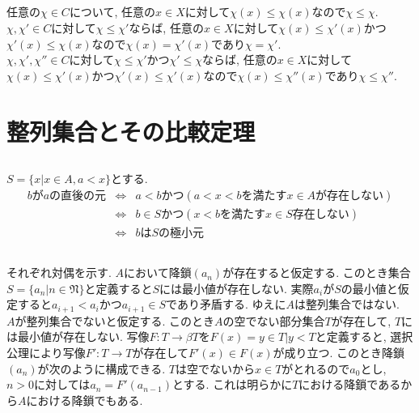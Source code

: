 \documentclass{jsarticle}
\begin{document}
\subsection{} %
任意の$\chi \in C$について, 任意の$x \in X$に対して$\chi(x) \le \chi(x)$なので$\chi \le \chi$.\\
$\chi, \chi' \in C$に対して$\chi \le \chi'$ならば, 任意の$x \in X$に対して$\chi(x) \le \chi'(x)$かつ$\chi'(x) \le \chi(x)$なので$\chi(x) = \chi'(x)$であり$\chi = \chi'$.\\
$\chi, \chi', \chi'' \in C$に対して$\chi \le \chi'$かつ$\chi' \le \chi$ならば, 任意の$x \in X$に対して$\chi(x) \le \chi'(x)$かつ$\chi'(x) \le \chi'(x)$なので$\chi(x) \le \chi''(x)$であり$\chi \le \chi''$.

\section{整列集合とその比較定理} %
\subsection{} %
$S = \{x | x \in A, a < x\}$とする.
\begin{eqnarray*}
	bがaの直後の元
	&\Leftrightarrow& a < bかつ(a < x < bを満たすx \in Aが存在しない)\\
	&\Leftrightarrow& b \in Sかつ(x < bを満たすx \in S存在しない)\\
	&\Leftrightarrow& bはSの極小元
\end{eqnarray*}

\subsection{} %
それぞれ対偶を示す. 
$A$において降鎖$(a_n)$が存在すると仮定する. このとき集合$S = \{a_n | n \in \mathfrak{N}\}$と定義すると$S$には最小値が存在しない. 実際$a_i$が$S$の最小値と仮定すると$a_{i + 1} < a_i$かつ$a_{i + 1} \in S$であり矛盾する. ゆえに$A$は整列集合ではない.\\
$A$が整列集合でないと仮定する. このとき$A$の空でない部分集合$T$が存在して, $T$には最小値が存在しない. 写像$F:T \rightarrow \beta{T}$を$F(x) = {y \in T | y < T}$と定義すると, 選択公理により写像$F': T \rightarrow T$が存在して$F'(x) \in F(x)$が成り立つ. このとき降鎖$(a_n)$が次のように構成できる. $T$は空でないから$x \in T$がとれるので$a_0$とし, $n > 0$に対しては$a_n = F'(a_{n - 1})$とする. これは明らかに$T$における降鎖であるから$A$における降鎖でもある.
\end{document}

